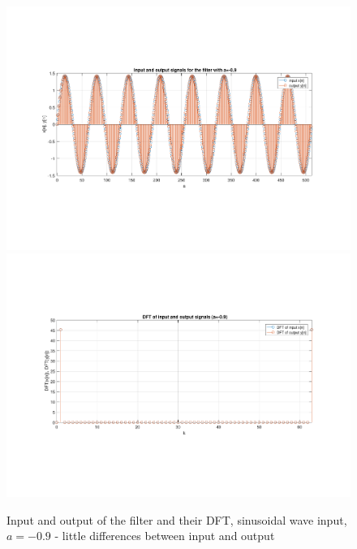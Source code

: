 \begin{figure} [H]
	\centering
	\includegraphics[trim={2.5cm 5cm 2.5cm 5cm}, clip, width=0.75\linewidth]{io_sin_1}
	\includegraphics[trim={2.5cm 5cm 2.5cm 5cm}, clip, width=0.75\linewidth]{dft_sin_1}
	\caption{Input and output of the filter and their DFT, sinusoidal wave input, $a=-0.9$ - little differences between input and output}
	\label{fig:t1_io_sin_1}
\end{figure}
